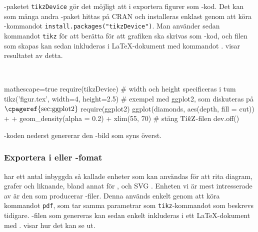 \documentclass[lang=sv,ptsize=10pt,font=none,nomath,titles=bf,../../a4.tex]{subfiles}
\begin{document}
\Rlogo-paketet \texttt{tikzDevice} \parencite{Sharpsteen12} gör det möjligt
att i \Rlogo exportera figurer som \PGFTikZ-kod. Det kan som många andra
\Rlogo-paket hittas på CRAN och installeras enklast genom att köra
\Rlogo-kommandot \verb|install.packages("tikzDevice")|. Man använder
sedan kommandot \texttt{tikz} för att berätta för \Rlogo att grafiken
ska skrivas som \PGFTikZ-kod, och filen som skapas kan sedan inkluderas
i \LaTeX-dokument med kommandot .
 visar resultatet av detta.

\begin{kod}[tbp]
	\centering
	\begin{minipage}{\textwidth}
		\centering
		
	\end{minipage}
	\\[1ex]
	\begin{minipage}{\textwidth}
		\begin{rcode*}{mathescape=true}
require(tikzDevice)
# width och height specificeras i tum
tikz('figur.tex', width=4, height=2.5)
# exempel med ggplot2, som diskuteras på $\text{\cpageref{sec:ggplot2}}$
require(ggplot2)
ggplot(diamonds, aes(depth, fill = cut)) +
  + geom_density(alpha = 0.2) + xlim(55, 70)
# stäng $\text{Ti\textit{k}Z}$-filen
dev.off()
		\end{rcode*}
	\end{minipage}
	\caption{\Rlogo-koden nederst genererar den \PGFTikZ-bild som
	syns överst.}
	\label{ex:tikzdevice}
\end{kod}


\subsubsection{Exportera i \PDF eller \PNG-fomat}

\Rlogo har ett antal inbyggda så kallade enheter  som kan
användas för att rita diagram, grafer och liknande, bland annat för \EPS,
\PNG och \textsc{SVG} \parencite[\ppno~675—676]{RCoreTeam12}. Enheten vi är mest
intresserade av är den som producerar \PDF-filer. Denna används enkelt
genom att köra kommandot \texttt{pdf}, som tar samma parametrar som
\texttt{tikz}-kommandot som beskrevs tidigare. \PDF-filen som genereras
kan sedan enkelt inkluderas i ett \LaTeX-dokument med .
 visar hur det kan se ut.
\end{document}
